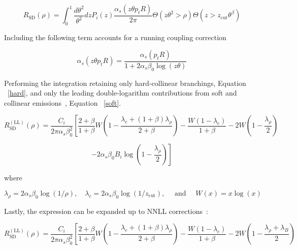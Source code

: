 \begin{equation}
R_{\mathrm{SD}}(\rho)=\int_{0}^{1} \frac{d \theta^{2}}{\theta^{2}} d z P_{i}(z) \frac{\alpha_{s}\left(z \theta p_{t} R\right)}{2 \pi} \Theta\left(z \theta^{2}>\rho\right) \Theta\left(z>z_{\mathrm{cut}} \theta^{\beta}\right)
\end{equation}


Including the following term accounts for a running coupling correction~\cite{Marzani:2019hun}

\begin{equation}
\alpha_{s}\left(z \theta p_{t} R\right)=\frac{\alpha_{s}\left(p_{t} R\right)}{1+2 \alpha_{s} \beta_{0} \log (z \theta)}
\end{equation}


Performing the integration retaining only hard-collinear branchings, Equation ~\ref{hard}, and only the leading double-logarithm contributions from soft and collinear emissions~\cite{Marzani:2019hun}, Equation ~\ref{soft}.



\begin{equation}
R_{\mathrm{SD}}^{(\mathrm{LL})}(\rho)=\frac{C_{i}}{2 \pi \alpha_{s} \beta_{0}^{2}}\left[\frac{2+\beta}{1+\beta} W\left(1-\frac{\lambda_{c}+(1+\beta) \lambda_{\rho}}{2+\beta}\right)-\frac{W\left(1-\lambda_{c}\right)}{1+\beta}-2 W\left(1-\frac{\lambda_{\rho}}{2}\right)\right.
\end{equation}\label{soft}



\begin{equation}
\left.-2 \alpha_{s} \beta_{0} B_{i} \log \left(1-\frac{\lambda_{\rho}}{2}\right)\right]
\end{equation}\label{hard}

where

\begin{equation}
\lambda_{\rho}=2 \alpha_{s} \beta_{0} \log (1 / \rho), \quad \lambda_{c}=2 \alpha_{s} \beta_{0} \log \left(1 / z_{\mathrm{cut}}\right), \quad \text { and } \quad W(x)=x \log (x)
\end{equation}



Lastly, the expression can be expanded up to NNLL corrections~\cite{Marzani:2019hun}:

\begin{equation}
R_{\mathrm{SD}}^{(\mathrm{LL})}(\rho)=\frac{C_{i}}{2 \pi \alpha_{s} \beta_{0}^{2}}\left[\frac{2+\beta}{1+\beta} W\left(1-\frac{\lambda_{c}+(1+\beta) \lambda_{\rho}}{2+\beta}\right)-\frac{W\left(1-\lambda_{c}\right)}{1+\beta}-2 W\left(1-\frac{\lambda_{\rho}+\lambda_{B}}{2}\right)\right.
\end{equation}


